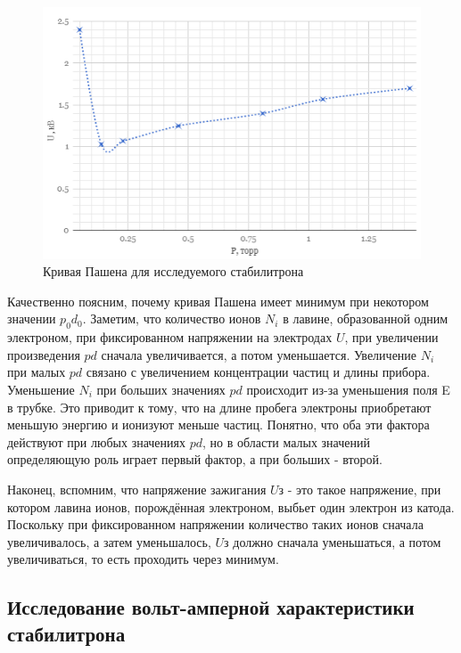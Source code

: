 \documentclass[a4paper]{article}
\begin{document}
\begin{figure}[h]
\begin{center}
\includegraphics[width=13cm]{pashen.PNG}
\caption{Кривая Пашена для исследуемого стабилитрона}
\label{ris:experimoriginal} %

\end{center}
\end{figure}

Качественно поясним, почему кривая Пашена имеет минимум при некотором значении
$p_0d_0$. Заметим, что количество ионов $N_i$ в лавине, образованной одним электроном, при фиксированном напряжении на электродах $U$, при увеличении произведения $pd$ сначала увеличивается, а потом уменьшается. Увеличение $N_i$ при малых $pd$ связано с увеличением концентрации частиц и длины прибора. Уменьшение $N_i$ при больших значениях $pd$ происходит
из-за уменьшения поля E в трубке. Это приводит к тому, что на длине пробега электроны
приобретают меньшую энергию и ионизуют меньше частиц. Понятно, что оба эти фактора действуют при любых значениях $pd$, но в области малых значений определяющую роль
играет первый фактор, а при больших - второй. \par Наконец, вспомним, что напряжение зажигания $U$з - это такое напряжение, при котором лавина ионов, порождённая электроном,
выбьет один электрон из катода. Поскольку при фиксированном напряжении количество таких ионов сначала увеличивалось, а затем уменьшалось, $U$з должно сначала уменьшаться, а
потом увеличиваться, то есть проходить через минимум.

\subsection{Исследование вольт-амперной характеристики стабилитрона}
\end{document}
